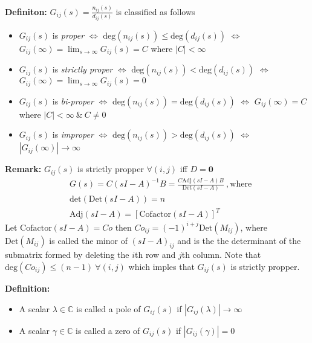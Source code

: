 \documentclass[twoside]{article}
\begin{document}
\textbf{Definiton:} $G_{ij}(s) = \frac{n_{ij}(s)}{d_{ij}(s)}$ is
classified as follows
%
\begin{itemize}
  \item $G_{ij}(s)$ is \textit{proper} $\Leftrightarrow$
    $\mathrm{deg}( n_{ij}(s) ) \leq \mathrm{deg}( d_{ij}(s) )$
    $\Leftrightarrow$ $G_{ij}(\infty) = \lim_{s \to \infty} G_{ij}(s)
    = C $ where $|C| < \infty$
  \item $G_{ij}(s)$ is \textit{strictly proper} $\Leftrightarrow$
    $\mathrm{deg}( n_{ij}(s) ) < \mathrm{deg}( d_{ij}(s) )$
    $\Leftrightarrow$ $G_{ij}(\infty) = \lim_{s \to \infty} G_{ij}(s)
    = 0 $ 
  \item $G_{ij}(s)$ is \textit{bi-proper} $\Leftrightarrow$
    $\mathrm{deg}( n_{ij}(s) ) = \mathrm{deg}( d_{ij}(s) )$
    $\Leftrightarrow$ $G_{ij}(\infty) 
    = C $ where $| C | < \infty \ \& \ C \neq 0$ 
  \item $G_{ij}(s)$ is \textit{improper} $\Leftrightarrow$
    $\mathrm{deg}( n_{ij}(s) ) > \mathrm{deg}( d_{ij}(s) )$
    $\Leftrightarrow $ $ | G_{ij}(\infty) | \to \infty $ 
\end{itemize}

\textbf{Remark:} $G_{ij}(s)$ is strictly propper $\forall (i,j)$ iff
$D = \mathbf{0}$
%
\begin{align*}
&G(s) = C \left( s I - A \right)^{-1} B =\frac{ C \mathrm{Adj}\left( s
       I - A \right) B}{ \mathrm{Det}\left( s
       I - A \right) } \ , \mathrm{where}
\\
&\mathrm{det} \left( \mathrm{Det}\left( s I - A \right) \right) = n
\\
&\mathrm{Adj}\left( s I - A \right) = \left[ \mathrm{Cofactor}\left(
  s I - A \right) \right]^T
\end{align*}
%
Let $ \mathrm{Cofactor}\left(
  s I - A \right) = Co$ then $Co_{ij} = (-1)^{i+j} \mathrm{Det}\left( M_{ij}
  \right)$, where $\mathrm{Det}\left( M_{ij} \right)$ is called the
  minor of $\left( s I - A \right)_{ij}$ and is the the determinant of
  the submatrix formed by deleting the $i$th row and $j$th column.
  Note that $\mathrm{deg}(Co_{ij}) \leq (n-1) \ \forall (i,j)$ which
  imples that $G_{ij}(s)$ is strictly propper.

\vspace{6pt}

\textbf{Definition:} 
\vspace{-6pt}
\begin{itemize}
\item A scalar $\lambda \in \mathbb{C}$ is called a pole of $G_{ij}(s)$ if $
| G_{ij}(\lambda) | \to \infty $
\item A scalar $\gamma \in \mathbb{C}$ is called a zero of $G_{ij}(s)$ if $
| G_{ij}(\gamma) | = 0 $
\end{itemize}
\end{document}

